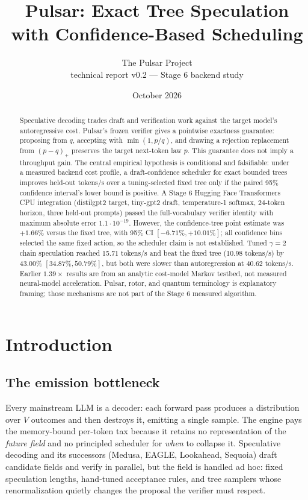 \documentclass[11pt,a4paper]{article}
\title{\textbf{Pulsar: Exact Tree Speculation with Confidence-Based Scheduling}}
\author{The Pulsar Project\\\small technical report v0.2 --- Stage 6 backend study}
\date{October 2026}
\theoremstyle{definition}
\begin{document}
\maketitle

\begin{abstract}
\noindent
Speculative decoding trades draft and verification work against the target
model's autoregressive cost. Pulsar's frozen verifier gives a pointwise
exactness guarantee: proposing from $q$, accepting with $\min(1,p/q)$, and
drawing a rejection replacement from $(p-q)_+$ preserves the target next-token
law $p$. This guarantee does not imply a throughput gain. The central empirical
hypothesis is conditional and falsifiable: under a measured backend cost
profile, a draft-confidence scheduler for exact bounded trees improves held-out
tokens/s over a tuning-selected fixed tree only if the paired 95\% confidence
interval's lower bound is positive. A Stage 6 Hugging Face Transformers CPU
integration (distilgpt2 target, tiny-gpt2 draft, temperature-1 softmax, 24-token
horizon, three held-out prompts) passed the full-vocabulary verifier identity
with maximum absolute error $1.1\cdot10^{-19}$. However, the confidence-tree
point estimate was $+1.66\%$ versus the fixed tree, with 95\% CI
$[-6.71\%,+10.01\%]$; all confidence bins selected the same fixed action, so
the scheduler claim is not established. Tuned $\gamma=2$ chain speculation
reached 15.71 tokens/s and beat the fixed tree (10.98 tokens/s) by 43.00\%
$[34.87\%,50.79\%]$, but both were slower than autoregression at 40.62
tokens/s. Earlier $1.39\times$ results are from an analytic cost-model Markov
testbed, not measured neural-model acceleration. Pulsar, rotor, and quantum
terminology is explanatory framing; those mechanisms are not part of the Stage
6 measured algorithm.
\end{abstract}

\section{Introduction}

\subsection{The emission bottleneck}
Every mainstream LLM is a decoder: each forward pass produces a distribution
over $V$ outcomes and then destroys it, emitting a single sample. The engine
pays the memory-bound per-token tax because it retains no representation of
the \emph{future field} and no principled scheduler for \emph{when} to
collapse it. Speculative decoding and its successors (Medusa, EAGLE,
Lookahead, Sequoia) draft candidate fields and verify in parallel, but the
field is handled ad hoc: fixed speculation lengths, hand-tuned acceptance
rules, and tree samplers whose renormalization quietly changes the proposal
the verifier must respect.
\end{document}
